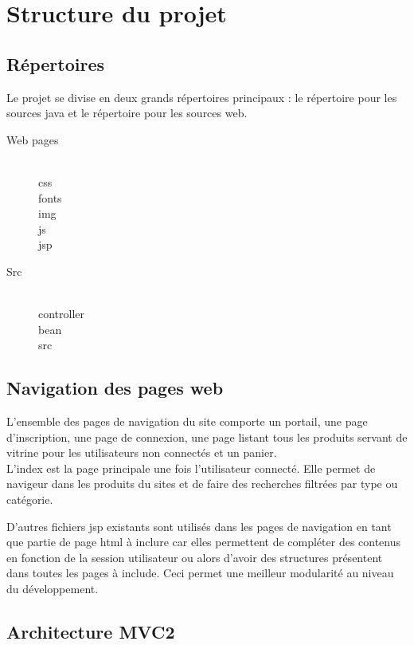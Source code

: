 \section{Structure du projet}

\subsection{Répertoires}

Le projet se divise en deux grands répertoires principaux : le répertoire pour 
les sources java et le répertoire pour les sources web.

\begin{description}
	\item[Web pages] \hfill \\
		css \\
		fonts \\
		img \\
		js \\
		jsp
	\item[Src] \hfill \\
		controller \\
		bean \\
		src
\end{description}

\subsection{Navigation des pages web}

L'ensemble des pages de navigation du site comporte un portail, une page 
d'inscription, une page de connexion, une page listant tous les produits servant 
de vitrine pour les utilisateurs non connectés et un panier. \\

L'index est la page principale une fois l'utilisateur connecté. Elle permet de 
navigeur dans les produits du sites et de faire des recherches filtrées par 
type ou catégorie.

D'autres fichiers jsp existants sont utilisés dans les pages de navigation en 
tant que partie de page html à inclure car elles permettent de compléter des 
contenus en fonction de la session utilisateur ou alors d'avoir des structures 
présentent dans toutes les pages à include. Ceci permet une meilleur modularité 
au niveau du développement.

\subsection{Architecture MVC2}

